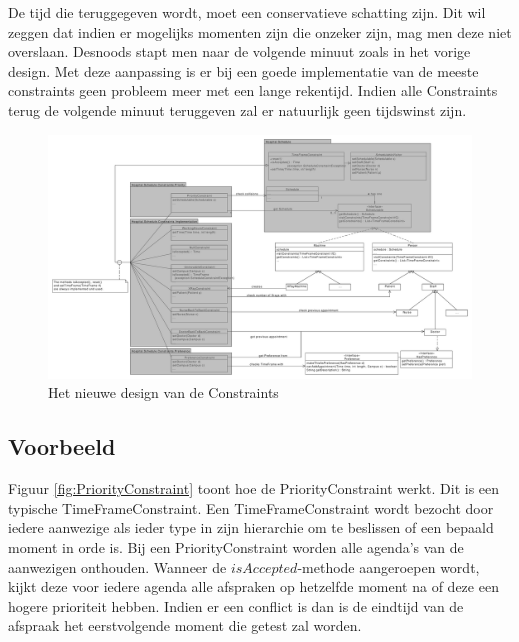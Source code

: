 De tijd die teruggegeven wordt, moet een conservatieve schatting zijn. 
Dit wil zeggen dat indien er mogelijks momenten zijn die onzeker zijn, mag men deze niet overslaan. 
Desnoods stapt men naar de volgende minuut zoals in het vorige design. 
Met deze aanpassing is er bij een goede implementatie van de meeste constraints geen probleem meer met een lange rekentijd. 
Indien alle Constraints terug de volgende minuut teruggeven zal er natuurlijk geen tijdswinst zijn. 
\begin{figure}
\vspace{-2cm}
  \begin{center}
    \includegraphics[width=1.0\textheight,angle=270]{./exported/Constraints.pdf}
  \end{center}
  \caption{Het nieuwe design van de Constraints\label{fig:Constraints}}
\vspace{2cm}
\end{figure} 

\subsection{Voorbeeld}
Figuur \ref{fig:PriorityConstraint} toont hoe de PriorityConstraint werkt. Dit is een typische TimeFrameConstraint. 
Een TimeFrameConstraint wordt bezocht door iedere aanwezige als ieder type in zijn hierarchie om te beslissen of een bepaald moment in orde is. 
Bij een PriorityConstraint worden alle agenda's van de aanwezigen onthouden. 
Wanneer de $isAccepted$-methode aangeroepen wordt, kijkt deze voor iedere agenda alle afspraken op hetzelfde moment na of deze een hogere prioriteit hebben. 
Indien er een conflict is dan is de eindtijd van de afspraak het eerstvolgende moment die getest zal worden. \\

